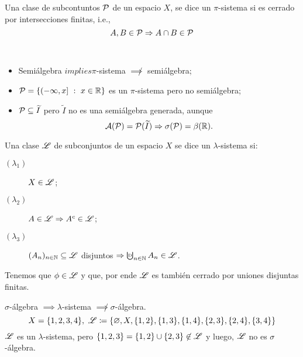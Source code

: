 \begin{definition}[$\pi$-sistema]
	Una clase de subcontuntos $\mathcal{P}$ de un espacio $X$, se dice un $\pi$-sistema si es cerrado por intersecciones finitas, i.e.,
	\[ A,B \in \mathcal{P} \Rightarrow{} A \cap B \in \mathcal{P} \]
\end{definition}

\begin{eg}~
	\begin{itemize}
		\item Semiálgebra $implies \pi$-sistema $\not\implies$ semiálgebra;
		
		\item $\mathcal{P} = \{(-\infty,x] \ : \ x \in \mathbb{R}\}$ es un $\pi$-sistema pero no semiálgebra;

		\item $\mathcal{P} \subseteq \widetilde{I}$ pero $\widetilde{I}$ no es una semiálgebra generada, aunque
		\[ \mathcal{A}(\mathcal{P}) = \mathcal{P}(\widetilde{I}) \Rightarrow \sigma(\mathcal{P}) = \beta(\mathbb{R}). \]
	\end{itemize}
\end{eg}

\begin{definition}
	Una clase $\mathscr{L}$ de subconjuntos de un espacio $X$ se dice un $\lambda$-sistema si:
	\begin{description}
		\item[$(\lambda_{1})$] $X \in \mathscr{L}$;

		\item[$(\lambda_{2})$] $A \in \mathscr{L} \Rightarrow A^c \in \mathscr{L}$;

		\item[$(\lambda_{3})$] $(A_n)_{n\in\mathbb{N}} \subseteq \mathscr{L}$ disjuntos $\implies \textbigcupd_{n\in\N} A_n \in \mscr{L}$.
	\end{description}
\end{definition}

\begin{note}
	Tenemos que $\phi \in \mathscr{L}$ y que, por ende $\mathscr{L}$ es también cerrado por uniones disjuntas finitas.
\end{note}

\begin{eg}
	$\sigma$-álgebra $\implies \lambda$-sistema $\not\implies \sigma$-álgebra.
	\[ X = \{1,2,3,4\}, \ \mathscr{L} \coloneq \{\varnothing, X, \{1,2\}, \{1,3\}, \{1,4\}, \{2,3\}, \{2,4\}, \{3,4\}\} \]
	$\mathscr{L}$ es un $\lambda$-sistema, pero $\{1,2,3\} = \{1,2\} \cup \{2,3\} \not\in \mathscr{L}$ y luego, $\mathscr{L}$ no es $\sigma$-álgebra.
\end{eg}

